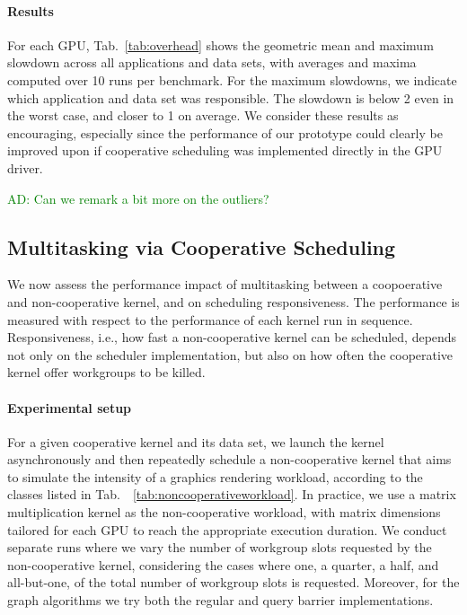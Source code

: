 \documentclass[numbers,nocopyrightspace,10pt]{sigplanconf}
\newcommand{\ADComment}[1]{\textcolor{green}{AD: #1}}
\newcommand{\mytab}{Tab.~}
\begin{document}
\paragraph{Results}
For each GPU, \mytab\ref{tab:overhead} shows the geometric mean and
maximum slowdown across all applications and data sets, with averages and maxima computed over 10 runs per benchmark. For the maximum slowdowns, we indicate which
application and data set was responsible.  The slowdown is below 2 even
in the worst case, and closer to 1 on average. We consider these results
as encouraging, especially since the performance of our prototype could
clearly be improved upon if cooperative scheduling was implemented
directly in the GPU driver.

\ADComment{Can we remark a bit more on the outliers?}

\subsection{Multitasking via Cooperative Scheduling}\label{sec:responsiveness}

We now assess the performance impact of multitasking between a
coopoerative and non-cooperative kernel, and on scheduling
responsiveness.  The performance is measured with respect to the
performance of each kernel run in sequence. Responsiveness, i.e., how
fast a non-cooperative kernel can be scheduled, depends not only on
the scheduler implementation, but also on how often the cooperative
kernel offer workgroups to be killed.


\paragraph{Experimental setup}
For a given cooperative kernel and its data set, we launch the kernel
asynchronously and then repeatedly schedule a non-cooperative kernel
that aims to simulate the intensity of a graphics rendering workload,
according to the classes listed in
\mytab~\ref{tab:noncooperativeworkload}. In practice, we use a matrix
multiplication kernel as the non-cooperative workload, with matrix
dimensions tailored for each GPU to reach the appropriate execution
duration.  We conduct separate runs where we vary the number of workgroup slots requested by the non-cooperative kernel,
considering the cases where one, a quarter, a half, and all-but-one, of the total number of workgroup slots is requested.
Moreover, for the graph algorithms we try both the
regular and query barrier implementations.
\end{document}
